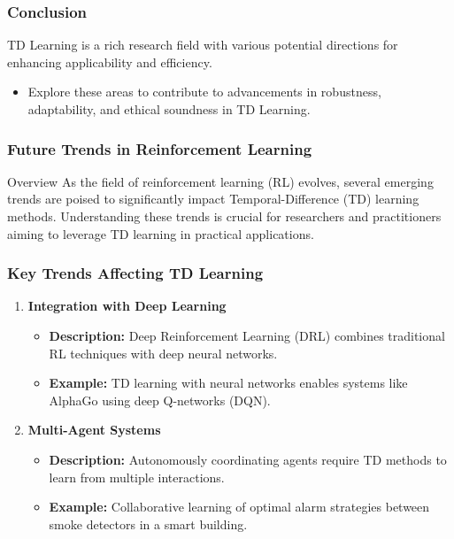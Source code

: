 \documentclass[aspectratio=169]{beamer}
\begin{document}
\begin{frame}[fragile]
    \frametitle{Conclusion}
    TD Learning is a rich research field with various potential directions for enhancing applicability and efficiency.
    \begin{itemize}
        \item Explore these areas to contribute to advancements in robustness, adaptability, and ethical soundness in TD Learning.
    \end{itemize}
\end{frame}

\begin{frame}[fragile]
    \frametitle{Future Trends in Reinforcement Learning}
    \begin{block}{Overview}
        As the field of reinforcement learning (RL) evolves, several emerging trends are poised to significantly impact Temporal-Difference (TD) learning methods. Understanding these trends is crucial for researchers and practitioners aiming to leverage TD learning in practical applications.
    \end{block}
\end{frame}

\begin{frame}[fragile]
    \frametitle{Key Trends Affecting TD Learning}
    \begin{enumerate}
        \item \textbf{Integration with Deep Learning}
            \begin{itemize}
                \item \textbf{Description:} Deep Reinforcement Learning (DRL) combines traditional RL techniques with deep neural networks.
                \item \textbf{Example:} TD learning with neural networks enables systems like AlphaGo using deep Q-networks (DQN).
            \end{itemize}
        
        \item \textbf{Multi-Agent Systems}
            \begin{itemize}
                \item \textbf{Description:} Autonomously coordinating agents require TD methods to learn from multiple interactions.
                \item \textbf{Example:} Collaborative learning of optimal alarm strategies between smoke detectors in a smart building.
            \end{itemize}
    \end{enumerate}
\end{frame}
\end{document}
